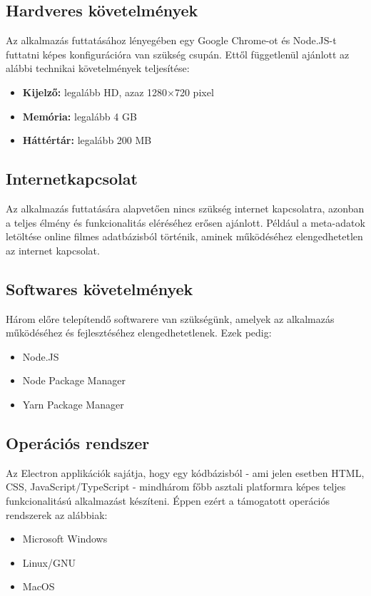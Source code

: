 \subsection{Hardveres követelmények}
Az alkalmazás futtatásához lényegében egy Google Chrome-ot és Node.JS-t futtatni képes konfigurációra van szükség csupán. Ettől függetlenül ajánlott az alábbi technikai követelmények teljesítése:
\begin{itemize}
    \item {\textbf {Kijelző: }} legalább HD, azaz 1280×720 pixel
	\item {\textbf {Memória: }} legalább 4 GB
	\item {\textbf {Háttértár: }} legalább 200 MB
\end{itemize}

\subsection{Internetkapcsolat}
Az alkalmazás futtatására alapvetően nincs szükség internet kapcsolatra, azonban a teljes élmény és funkcionalitás eléréséhez erősen ajánlott. Például a meta-adatok letöltése online filmes adatbázisból történik, aminek működéséhez elengedhetetlen az internet kapcsolat.

\subsection{Softwares követelmények}
Három előre telepítendő softwarere van szükségünk, amelyek az alkalmazás működéséhez és fejlesztéséhez elengedhetetlenek. Ezek pedig:
\begin{itemize}
	\item Node.JS
	\item Node Package Manager
	\item Yarn Package Manager
\end{itemize}

\subsection{Operációs rendszer}
Az Electron applikációk sajátja, hogy egy kódbázisból - ami jelen esetben HTML, CSS, JavaScript/TypeScript - mindhárom főbb asztali platformra képes teljes funkcionalitású alkalmazást készíteni. Éppen ezért a támogatott operációs rendszerek az alábbiak:
\begin{itemize}
	\item Microsoft Windows
	\item Linux/GNU
	\item MacOS
\end{itemize}


